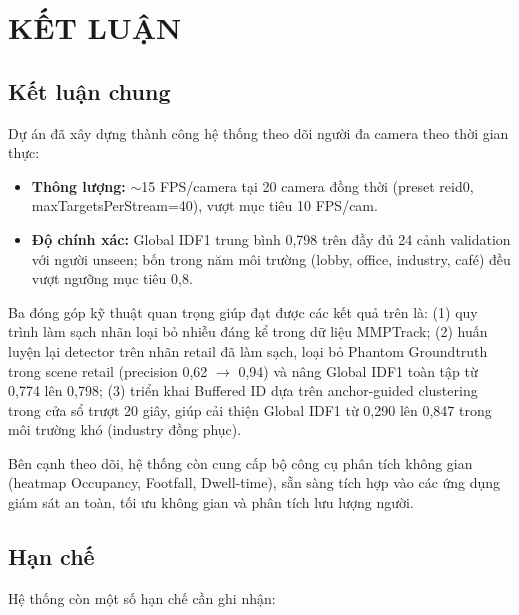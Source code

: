 \documentclass{article} %
\begin{document}
\section*{KẾT LUẬN}

\subsection*{Kết luận chung}

Dự án đã xây dựng thành công hệ thống theo dõi người đa camera theo thời gian thực:

\begin{itemize}
    \item \textbf{Thông lượng:} $\sim$15 FPS/camera tại 20 camera đồng thời (preset reid0, maxTargetsPerStream=40), vượt mục tiêu 10 FPS/cam.
    \item \textbf{Độ chính xác:} Global IDF1 trung bình 0,798 trên đầy đủ 24 cảnh validation với người unseen; bốn trong năm môi trường (lobby, office, industry, café) đều vượt ngưỡng mục tiêu 0,8.
\end{itemize}

Ba đóng góp kỹ thuật quan trọng giúp đạt được các kết quả trên là: (1) quy trình làm sạch nhãn loại bỏ nhiễu đáng kể trong dữ liệu MMPTrack; (2) huấn luyện lại detector trên nhãn retail đã làm sạch, loại bỏ Phantom Groundtruth trong scene retail (precision 0,62 $\to$ 0,94) và nâng Global IDF1 toàn tập từ 0,774 lên 0,798; (3) triển khai Buffered ID dựa trên anchor-guided clustering \cite{Huang2023} trong cửa sổ trượt 20 giây, giúp cải thiện Global IDF1 từ 0,290 lên 0,847 trong môi trường khó (industry đồng phục).

Bên cạnh theo dõi, hệ thống còn cung cấp bộ công cụ phân tích không gian (heatmap Occupancy, Footfall, Dwell-time), sẵn sàng tích hợp vào các ứng dụng giám sát an toàn, tối ưu không gian và phân tích lưu lượng người.

\subsection*{Hạn chế}

Hệ thống còn một số hạn chế cần ghi nhận:
\end{document}
